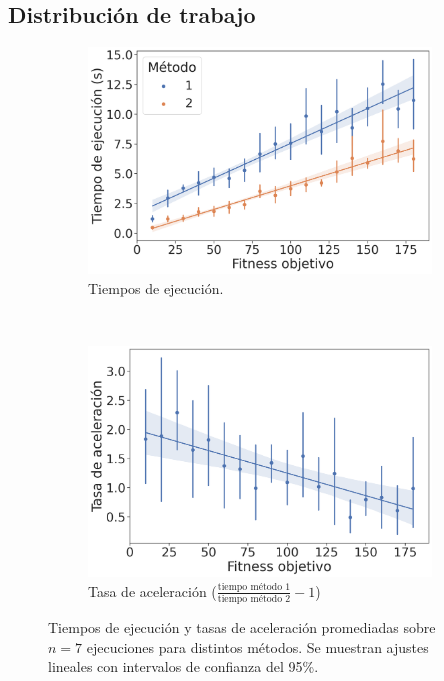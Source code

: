 \documentclass[twocolumn,spanish]{revtex4-1}
\begin{document}
\subsection{Distribución de trabajo}
\begin{figure}[hb]
\centering
    \begin{subfigure}{\linewidth}
        \centering
        \includegraphics[width=0.9\linewidth]{eval_metodos.png}
        \caption{Tiempos de ejecución.}
        \label{fig:eval_metodos}
    \end{subfigure}%
    ~\\\vspace{12pt}
    \begin{subfigure}{\linewidth}
        \centering
        \includegraphics[width=0.9\linewidth]{acel_metodos.png}
        \caption{Tasa de aceleración ($\frac{\text{tiempo método 1}}{\text{tiempo método 2}}-1$)}
        \label{fig:acel_metodos}
    \end{subfigure}%
    \caption{Tiempos de ejecución y tasas de aceleración promediadas sobre $n=7$ ejecuciones para distintos métodos. Se muestran ajustes lineales con intervalos de confianza del 95\%.}
    \label{metodos}
\end{figure}
\end{document}

